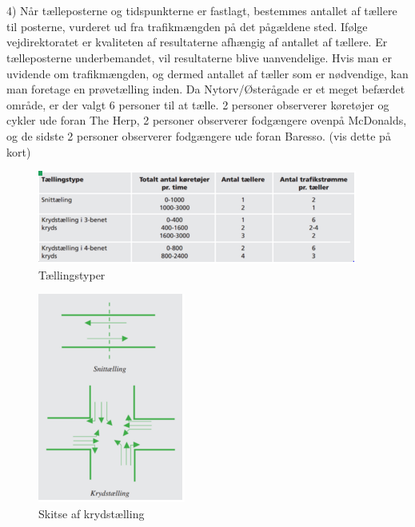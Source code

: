 \\\\
4) Når tælleposterne og tidspunkterne er fastlagt, bestemmes antallet af tællere til posterne, vurderet ud fra trafikmængden på det pågældene sted. Ifølge vejdirektoratet er kvaliteten af resultaterne afhængig af antallet af tællere. Er tælleposterne underbemandet, vil resultaterne blive uanvendelige. Hvis man er uvidende om trafikmængden, og dermed antallet af tæller som er nødvendige, kan man foretage en prøvetælling inden. Da Nytorv/Østerågade er et meget befærdet område, er der valgt 6 personer til at tælle. 2 personer observerer køretøjer og cykler ude foran The Herp, 2 personer observerer fodgængere ovenpå McDonalds, og de sidste 2 personer observerer fodgængere ude foran Baresso. (vis dette på kort)

\begin{figure}[htbp]
   \label{fig:taellingstype}
   \centering
   \begin{adjustbox}{max width=\textwidth}
     \includegraphics[scale=1]{billederogfigur/taellingstype.jpg}
  \end{adjustbox}
   \caption{Tællingstyper}
 \end{figure}
 
 \begin{figure}[htbp]
   \label{fig:krydstaelling}
   \centering
   \begin{adjustbox}{max width=\textwidth}
     \includegraphics[scale=1]{billederogfigur/krydstaelling.jpg}
  \end{adjustbox}
   \caption{Skitse af krydstælling}
 \end{figure}
 

